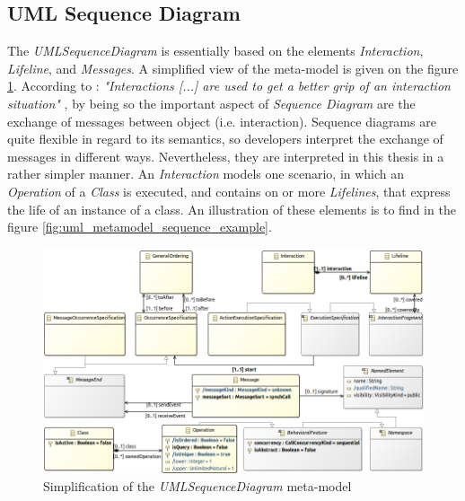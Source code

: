 \documentclass[tuberlin,cic,tc,english,noabntcite]{iiufrgs}
\begin{document}
\subsection{UML Sequence Diagram}
The \emph{UMLSequenceDiagram} is essentially based on the elements \emph{Interaction}, \emph{Lifeline}, and \emph{Messages}. A simplified view of the meta-model is given on the figure \ref{fig:uml_metamodel_sequence}. According to \citet[p. 563]{omg2007unified}: \emph{"Interactions [...] are used to get a better grip of an interaction situation"} \citep[p. 563]{omg2007unified}, by being so the important aspect of \emph{Sequence Diagram} are the exchange of messages between object (i.e. interaction). Sequence diagrams are quite flexible in regard to its semantics, so developers interpret the exchange of messages in different ways. Nevertheless, they are interpreted in this thesis in a rather simpler manner. An \emph{Interaction} models one scenario, in which an \emph{Operation} of a \emph{Class} is executed, and contains on or more \emph{Lifelines}, that express the life of an instance of a class. An illustration of these elements is to find in the figure \ref{fig:uml_metamodel_sequence_example}.

\begin{figure}[H]
    \caption{Simplification of the \emph{UMLSequenceDiagram} meta-model}
    \begin{center}
        \includegraphics[width=40em]{umlSequenceDiagramSimple01}
    \end{center}
    \label{fig:uml_metamodel_sequence}
\end{figure}
\end{document}
